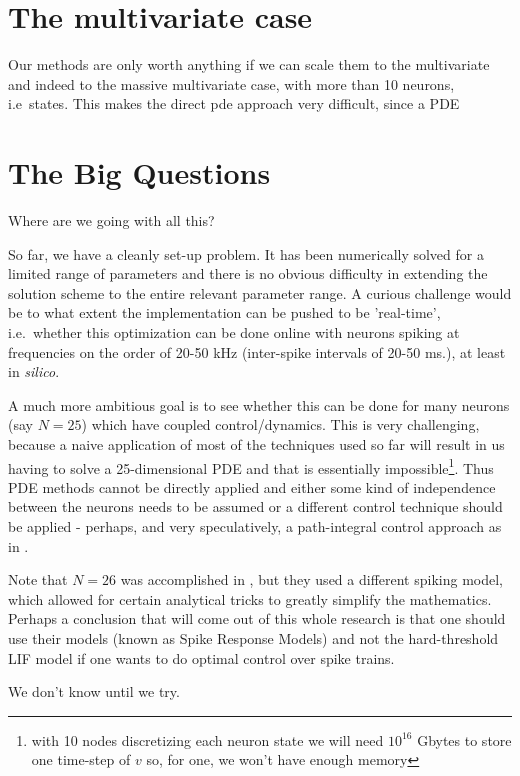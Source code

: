 \documentclass{article}
\begin{document}
\section{The multivariate case}
Our methods are only worth anything if we can scale them to the multivariate and
indeed to the massive multivariate case, with more than 10 neurons, i.e\
states. This makes the direct pde approach very difficult, since a PDE 


\section{The Big Questions}
Where are we going with all this? 

So far, we have a cleanly set-up problem. It has been numerically solved for a
limited range of parameters and there is no obvious difficulty in extending the
solution scheme to the entire relevant parameter range. A curious challenge
would be to what extent the implementation can be pushed to be 'real-time',
i.e.\ whether this optimization can be done online with neurons spiking at
frequencies on the order of 20-50 kHz (inter-spike intervals of 20-50 ms.), at
least in {\sl silico}.

A much more ambitious goal is to see whether this can be done for many neurons
(say $N=25$) which have coupled control/dynamics. This is very challenging,
because a naive application of most of the techniques used so far will result in
us having to solve a 25-dimensional PDE and that is essentially
impossible\footnote{with 10 nodes discretizing each neuron state we will need
$10^{16}$ Gbytes to store one time-step of $v$ so, for one, we won't have enough
memory}. Thus PDE methods cannot be directly applied and either some kind of
independence between the neurons needs to be assumed or a different control
technique should be applied - perhaps, and very speculatively, a path-integral
control approach as in \cite{Kappen2007,Theodoru2011}.

Note that $N=26$ was accomplished in \cite{Ahmadian2011}, but they used a
different spiking model, which allowed for certain analytical tricks to greatly
simplify the mathematics. Perhaps a conclusion that will come out of this whole
research is that one should use their models (known as Spike Response
Models) and not the hard-threshold LIF model if one wants to do optimal control
over spike trains. 

We don't know until we try.

\end{document}
